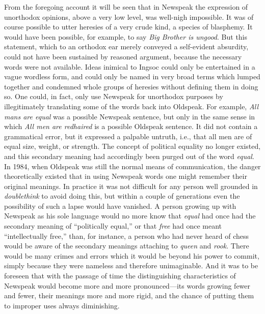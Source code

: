 From the foregoing account it will be seen that in Newspeak the
expression of unorthodox opinions, above a very low level, was well-nigh
impossible. It was of course possible to utter heresies of a very crude
kind, a species of blasphemy. It would have been possible, for example,
to say \emph{Big Brother is ungood}. But this statement, which to an
orthodox ear merely conveyed a self-evident absurdity, could not have
been sustained by reasoned argument, because the necessary words were
not available. Ideas inimical to Ingsoc could only be entertained in a
vague wordless form, and could only be named in very broad terms which
lumped together and condemned whole groups of heresies without defining
them in doing so. One could, in fact, only use Newspeak for unorthodox
purposes by illegitimately translating some of the words back into
Oldspeak. For example, \emph{All mans are equal} was a possible Newspeak
sentence, but only in the same sense in which \emph{All men are
redhaired} is a possible Oldspeak sentence. It did not contain a
grammatical error, but it expressed a palpable untruth, i.e., that all
men are of equal size, weight, or strength. The concept of political
equality no longer existed, and this secondary meaning had accordingly
been purged out of the word \emph{equal}. In 1984, when Oldspeak was
still the normal means of communication, the danger theoretically
existed that in using Newspeak words one might remember their original
meanings. In practice it was not difficult for any person well grounded
in \emph{doublethink} to avoid doing this, but within a couple of
generations even the possibility of such a lapse would have vanished. A
person growing up with Newspeak as his sole language would no more know
that \emph{equal} had once had the secondary meaning of ``politically
equal,'' or that \emph{free} had once meant ``intellectually free,'' than,
for instance, a person who had never heard of chess would be aware of
the secondary meanings attaching to \emph{queen} and \emph{rook}. There
would be many crimes and errors which it would be beyond his power to
commit, simply because they were nameless and therefore unimaginable.
And it was to be foreseen that with the passage of time the
distinguishing characteristics of Newspeak would become more and more
pronounced---its words growing fewer and fewer, their meanings more and
more rigid, and the chance of putting them to improper uses always
diminishing.

